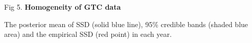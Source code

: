 \documentclass[a0paper,portrait]{baposter}
\renewcommand{\baselinestretch}{1}
\begin{document}
\begin{poster}
{\begin{minipage}[c]{0.45\textwidth}
\vspace{-0.8cm}
\begin{center}
\scriptsize Fig 5. \textbf{Homogeneity of GTC data}\\ 
\end{center}
\begin{flushleft}
\vspace{-0.2cm}
\begin{myindentpar}{0.5cm}
\renewcommand{\baselinestretch}{0.8}
\scriptsize The posterior mean of  SSD (solid blue line), 95\% credible bands (shaded blue area) and the empirical SSD (red point) in each year.
\end{myindentpar}
\end{flushleft}
\vspace{0.1cm}

\end{minipage}



}



\renewcommand{\baselinestretch}{1.0}


\end{poster}
\end{document}
